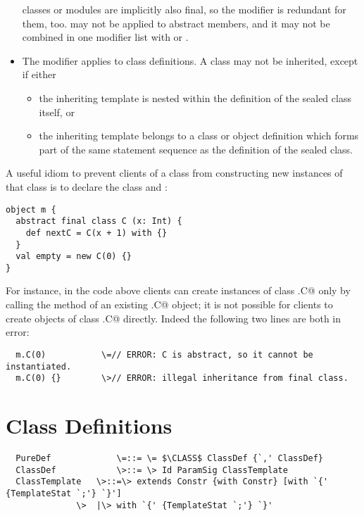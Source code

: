 \documentclass[11pt]{report}
\begin{document}
\begin{itemize}
classes or modules are implicitly also final, so the \verb@final@
modifier is redundant for them, too.  \verb@final@ may not be applied
to abstract members, and it may not be combined in one modifier list with
\verb@private@ or \verb@sealed@.
\item
The \verb@sealed@ modifier applies to class definitions. A
\verb@sealed@ class may not be inherited, except if either
\begin{itemize}
\item
the inheriting template is nested within the definition of the sealed
class itself, or
\item
the inheriting template belongs to a class or object definition which
forms part of the same statement sequence as the definition of the
sealed class.
\end{itemize}
\end{itemize}

\example A useful idiom to prevent clients of a class from
constructing new instances of that class is to declare the class
\verb@final@ and \verb@abstract@:

\begin{verbatim}
object m {
  abstract final class C (x: Int) {
    def nextC = C(x + 1) with {}
  }
  val empty = new C(0) {}
}
\end{verbatim}
For instance, in the code above clients can create instances of class
\verb@m.C@ only by calling the \verb@nextC@ method of an existing \verb@m.C@
object; it is not possible for clients to create objects of class
\verb@m.C@ directly. Indeed the following two lines are both in error:

\begin{verbatim}
  m.C(0)           \=// ERROR: C is abstract, so it cannot be instantiated.
  m.C(0) {}        \>// ERROR: illegal inheritance from final class.
\end{verbatim}

\section{Class Definitions}
\label{sec:classes}

\syntax\begin{verbatim}
  PureDef             \=::= \= $\CLASS$ ClassDef {`,' ClassDef}
  ClassDef            \>::= \> Id ParamSig ClassTemplate
  ClassTemplate   \>::=\> extends Constr {with Constr} [with `{' {TemplateStat `;'} `}']
	          \>  |\> with `{' {TemplateStat `;'} `}'
\end{verbatim}
\end{document}

